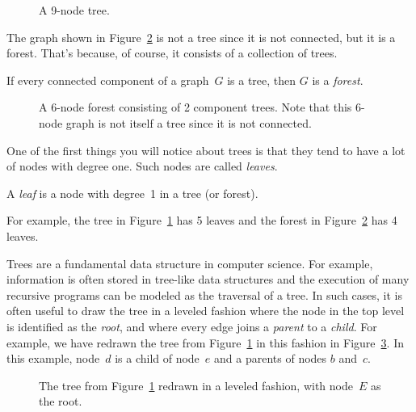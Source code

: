 \begin{figure}


\caption{A 9-node tree.}
\label{fig:5H}
\end{figure}

The graph shown in Figure~\ref{fig:5I} is not a tree since it is not
connected, but it is a forest.  That's because, of course, it consists
of a collection of trees.

\begin{definition}\label{def:forest}
If every connected component of a graph~$G$ is a tree, then $G$ is a
\emph{forest}.
\end{definition}

\begin{figure}


\caption{A 6-node forest consisting of 2 component trees.  Note that
  this 6-node graph is not itself a tree since it is not connected.}
\label{fig:5I}
\end{figure}

One of the first things you will notice about trees is that they tend
to have a lot of nodes with degree one.  Such nodes are called
\emph{leaves}.

\begin{definition}
A \emph{leaf} is a node with degree~1 in a tree (or forest).
\end{definition}

For example, the tree in Figure~\ref{fig:5H} has 5 leaves and the
forest in Figure~\ref{fig:5I} has 4 leaves.

Trees are a fundamental data structure in computer science.  For
example, information is often stored in tree-like data structures and
the execution of many recursive programs can be modeled as the
traversal of a tree.  In such cases, it is often useful to draw the
tree in a leveled fashion where the node in the top level is
identified as the \emph{root}, and where every edge joins a
\emph{parent} to a \emph{child}.  For example, we have redrawn the
tree from Figure~\ref{fig:5H} in this fashion in Figure~\ref{fig:5JJ}.
In this example, node~$d$ is a child of node~$e$ and a parents of
nodes $b$ and~$c$.

\begin{figure}


\caption{The tree from Figure~\ref{fig:5H} redrawn in a leveled
  fashion, with node~$E$ as the root.}

\label{fig:5JJ}
\end{figure}

